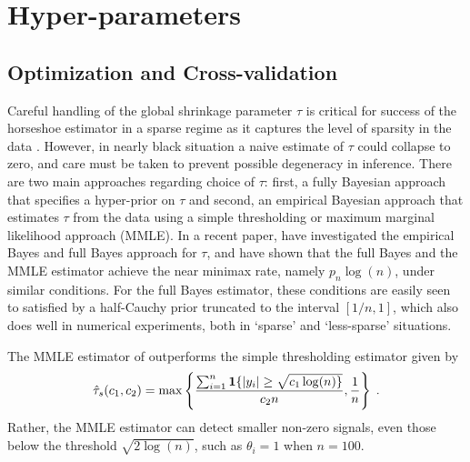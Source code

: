 \documentclass[sts,preprint]{imsart}
\begin{document}

\section{Hyper-parameters}\label{sec:5}

\subsection{Optimization and Cross-validation}

Careful handling of the global shrinkage parameter $\tau$ is critical for success of the horseshoe estimator in a sparse regime as it captures the level of sparsity in the data \citep{carvalho2010horseshoe, datta2013asymptotic, van2015conditions}. However, in nearly black situation a naive estimate of $\tau$ could collapse to zero, and care must be taken to prevent possible degeneracy in inference. There are two main approaches regarding choice of $\tau$: first, a fully Bayesian approach that specifies a hyper-prior
on $\tau$ and second, an empirical Bayesian approach that estimates $\tau$ from the data using a simple thresholding or maximum marginal likelihood approach (MMLE). In a recent paper, \citet{van2017adaptive} have investigated the empirical Bayes and full Bayes approach for $\tau$, and have shown that the
full Bayes and the MMLE estimator achieve the near minimax rate, namely $p_n \log(n)$, under similar conditions. For the full Bayes estimator, these conditions are easily seen to satisfied by a half-Cauchy prior truncated to the interval $[1/n,1]$, which also does well in numerical experiments, both in
`sparse' and `less-sparse' situations. 

The MMLE estimator of \citet{van2017adaptive} outperforms the simple thresholding estimator given by
\[
  \hat{\tau}_s(c_1, c_2) = \max \left \{ \frac{\sum_{i=1}^{n} {\bf 1} \{ \lvert y_i\rvert \ge
  \sqrt{c_1 \log(n) \}}}{c_2 n}, \frac{1}{n} \right\}
  \;.
\]
Rather, the MMLE estimator can detect smaller non-zero signals, even those below the threshold $\sqrt{2 \log(n)}$, such as $\theta_i = 1$ when $n = 100$. 
\end{document}
